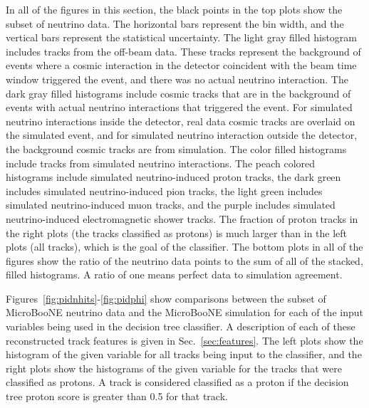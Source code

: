     In all of the figures in this section, the black points in the top plots
    show the subset of neutrino data.  The horizontal bars represent the bin
    width, and the vertical bars represent the statistical uncertainty. The
    light gray filled histogram includes tracks from the off-beam data. These
    tracks represent the background of events where a cosmic interaction in the
    detector coincident with the beam time window triggered the event, and
    there was no actual neutrino interaction. The dark gray filled histograms
    include cosmic tracks that are in the background of events with actual
    neutrino interactions that triggered the event. For simulated neutrino
    interactions inside the detector, real data cosmic tracks are overlaid on
    the simulated event, and for simulated neutrino interaction outside the
    detector, the background cosmic tracks are from simulation. The color
    filled histograms include tracks from simulated neutrino interactions. The
    peach colored histograms include simulated neutrino-induced proton tracks,
    the dark green includes simulated neutrino-induced pion tracks, the light
    green includes simulated neutrino-induced muon tracks, and the purple
    includes simulated neutrino-induced electromagnetic shower tracks. The
    fraction of proton tracks in the right plots (the tracks classified as
    protons) is much larger than in the left plots (all tracks), which is the
    goal of the classifier.  The bottom plots in all of the figures show the
    ratio of the neutrino data points to the sum of all of the stacked, filled
    histograms. A ratio of one means perfect data to simulation agreement.

    Figures~\ref{fig:pidnhits}-\ref{fig:pidphi} show comparisons between the
    subset of MicroBooNE neutrino data and the MicroBooNE simulation for each
    of the input variables being used in the decision tree classifier. A
    description of each of these reconstructed track features is given in
    Sec.~\ref{sec:features}. The left plots show the histogram of the given
    variable for all tracks being input to the classifier, and the right plots
    show the histograms of the given variable for the tracks that were
    classified as protons. A track is considered classified as a proton if the
    decision tree proton score is greater than 0.5 for that track.
    
